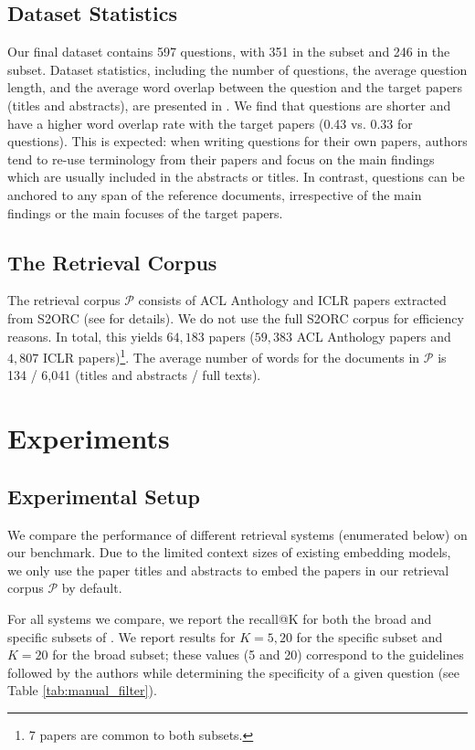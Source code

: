 \subsection{Dataset Statistics}
Our final dataset contains 597 questions, with 351 in the \inlineq{} subset and 246 in the \authorq{} subset. Dataset statistics, including the number of questions, the average question length, and the average word overlap between the question and the target papers (titles and abstracts), are presented in  . 
We find that \authorq{}
questions are shorter and have a higher word overlap rate with the target papers (0.43 vs. 0.33 for \inlineq{} questions). 
This is expected: when writing questions for their own papers, 
authors tend to re-use terminology from their papers and focus on  the main findings which are usually included in the abstracts or titles. 
In contrast, \inlineq{} questions can be anchored to any span of the reference documents, irrespective of the main findings or the main focuses of the target papers.

\subsection{The Retrieval Corpus}
The \ours{} retrieval corpus $\mathcal{P}$ consists of ACL Anthology and ICLR papers extracted from 
S2ORC (see  for details).
We do not use the full S2ORC corpus for efficiency reasons.
In total, this yields $64,183$ papers ($59,383$ ACL Anthology papers and $4,807$ ICLR papers)\footnote{$7$ papers are common to both subsets.}. 
The average number of words for the documents in $\mathcal{P}$ is 134 / 6,041 (titles and abstracts / full texts).

\section{Experiments}
\label{sec:systems}

\subsection{Experimental Setup} We compare the performance of different retrieval systems (enumerated below) on our \ours{} benchmark. Due to the limited context sizes of existing embedding models, we only use the paper titles and abstracts to embed the papers in our retrieval corpus $\mathcal{P}$ by default. 

For all systems we compare, we report the recall@K for both the broad and specific subsets of \ours{}. We report results for $K=5, 20$ for the specific subset and $K=20$ for the broad subset; these values (5 and 20) correspond to the guidelines followed by the authors while determining the specificity of a given question (see Table \ref{tab:manual_filter}).

